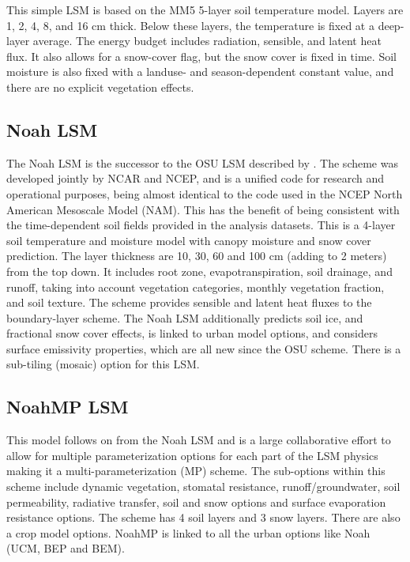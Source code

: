 This simple LSM is based on the MM5 5-layer soil temperature model. Layers are 
1, 2, 4, 8, and 16 cm thick. Below these layers, the temperature is fixed at a
deep-layer average. The energy budget includes radiation, sensible, and 
latent heat flux. It also allows for a snow-cover flag, but the snow 
cover is fixed in time. Soil moisture is also fixed with a landuse- and 
season-dependent constant value, and there are no explicit vegetation effects.

\subsection{Noah LSM}

The Noah LSM is the successor to the OSU LSM described by \citet{chendudhia01}. 
The scheme was developed jointly by NCAR and NCEP, and is a unified
code for research and operational purposes, being almost identical
to the code used in the NCEP North American Mesoscale Model (NAM). This has the benefit of 
being consistent with the time-dependent soil fields provided in the analysis datasets.
This is a 4-layer soil temperature and moisture model with canopy 
moisture and snow cover prediction. The layer thickness are 10, 30, 60 and 100 cm
(adding to 2 meters) from the top down. It includes root zone, evapotranspiration,
soil drainage, and runoff, taking into account vegetation categories,
monthly vegetation fraction, and soil texture. The scheme provides sensible and latent 
heat fluxes to the boundary-layer scheme. The Noah LSM additionally predicts 
soil ice, and fractional snow cover effects, is linked to urban model options,
and considers surface emissivity properties, which are all new since the OSU
scheme. There is a sub-tiling (mosaic) option for this LSM.

\subsection{NoahMP LSM}

This model follows on from the Noah LSM and is a large collaborative effort \citep{niu11, yang11} to allow for multiple parameterization options
for each part of the LSM physics making it a multi-parameterization (MP) scheme. The sub-options within this scheme
include dynamic vegetation, stomatal resistance, runoff/groundwater, soil permeability, radiative transfer, soil and snow
options and surface evaporation resistance options. The scheme has 4 soil layers and 3 snow layers.
There are also a crop model options. NoahMP is linked to all the urban options like Noah (UCM, BEP and BEM).

